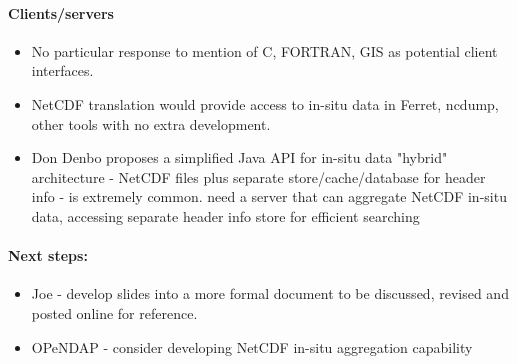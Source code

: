 \paragraph{Clients/servers}

\begin{itemize}
\item No particular response to mention of C, FORTRAN, GIS as
  potential client interfaces.
\item NetCDF translation would provide access to in-situ data in
  Ferret, ncdump, other tools with no extra development.
\item Don Denbo proposes a simplified Java API for in-situ data
  "hybrid" architecture - NetCDF files plus separate
  store/cache/database for header info - is extremely common.  need a
  server that can aggregate NetCDF in-situ data, accessing separate
  header info store for efficient searching
\end{itemize}

\paragraph{Next steps:}

\begin{itemize}
\item Joe - develop slides into a more formal document to be discussed, 
revised and posted online for reference.
\item OPeNDAP - consider developing NetCDF in-situ aggregation capability
\end{itemize}
                                
%
%
%
%

